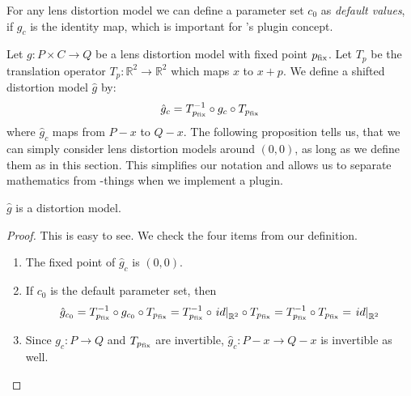 \documentclass[10pt,a4paper]{article}
\newcommand{\Rpow}[1]{\mathbb{R}^{#1}}
\begin{document}
\begin{rmrk}
For any lens distortion model we can define a parameter set $c_0$ as {\em default values},
if $g_c$ is the identity map, which is important for \tde's plugin concept.
\end{rmrk}
%
\begin{defn}
Let $g:P\times C \rightarrow Q$ be a lens distortion model with fixed point $p_{\mathrm{fix}}$.
Let $T_p$ be the translation operator $T_p:\Rpow{2}\rightarrow\Rpow{2}$
which maps $x$ to $x+p$. We define a shifted distortion model $\hat{g}$ by:
\begin{equation}
\hat{g}_c = T_{p_{\mathrm{fix}}}^{-1} \circ g_c \circ T_{p_{\mathrm{fix}}}
\end{equation}
where $\hat{g}_c$ maps from $P-x$ to $Q-x$.
The following proposition tells us, that we can simply consider lens distortion models
around $(0,0)$, as long as we define them as in this section. This simplifies
our notation and allows us to separate mathematics from \tde-things when we implement a plugin.
\end{defn}
\begin{prop}
\label{prop:ShiftedModel}
$\hat{g}$ is a distortion model.
\end{prop}
\begin{proof}
This is easy to see. We check the four items from our definition.
\begin{enumerate}
\item The fixed point of $\hat{g}_c$ is $(0,0)$.
\item If $c_0$ is the default parameter set, then
\begin{equation}
\hat{g}_{c_0} = T_{\pfix}^{-1} \circ g_{c_0} \circ T_{\pfix} = T_{\pfix}^{-1} \circ \left.id\right|_{\Rpow{2}} \circ T_{\pfix} = T_{\pfix}^{-1} \circ T_{\pfix} = \left.id\right|_{\Rpow{2}}
\end{equation}
\item Since $g_c:P\rightarrow Q$ and $T_{p_{\mathrm{fix}}}$ are invertible, $\hat{g}_c:P-x\rightarrow Q-x$ is invertible as well.
\end{enumerate}
\end{proof}
\end{document}
